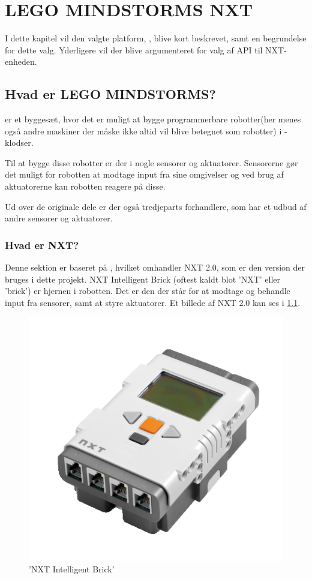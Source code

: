 
\chapter{LEGO MINDSTORMS NXT}
I dette kapitel vil den valgte platform, \legoms, blive kort beskrevet, samt en begrundelse for dette valg.
Yderligere vil der blive argumenteret for valg af API til NXT-enheden.

\section{Hvad er LEGO MINDSTORMS?}
\legoms er et byggesæt, hvor det er muligt at bygge programmerbare robotter(her menes også andre maskiner der måske ikke altid vil blive betegnet som robotter) i \lego-klodser.

Til at bygge disse robotter er der i \legoms nogle sensorer og aktuatorer. Sensorerne gør det muligt for robotten at modtage input fra sine omgivelser og ved brug af aktuatorerne kan robotten reagere på disse.

Ud over de originale \lego dele er der også tredjeparts forhandlere, som har et udbud af andre sensorer og aktuatorer.

\subsection{Hvad er NXT?}
Denne sektion er baseret på \cite{nxt}, hvilket omhandler NXT 2.0, som er den version der bruges i dette projekt.
NXT Intelligent Brick (oftest kaldt blot 'NXT' eller 'brick') er hjernen i \legoms robotten.
Det er den der står for at modtage og behandle input fra sensorer, samt at styre aktuatorer.
Et billede af NXT 2.0 kan ses i \cref{platform:nxt}.

\begin{figure}
\begin{center}
\includegraphics[scale=.5]{./graphics/nxt/brick}
\end{center}
\caption{'NXT Intelligent Brick'}
\label{platform:nxt}
\end{figure}


